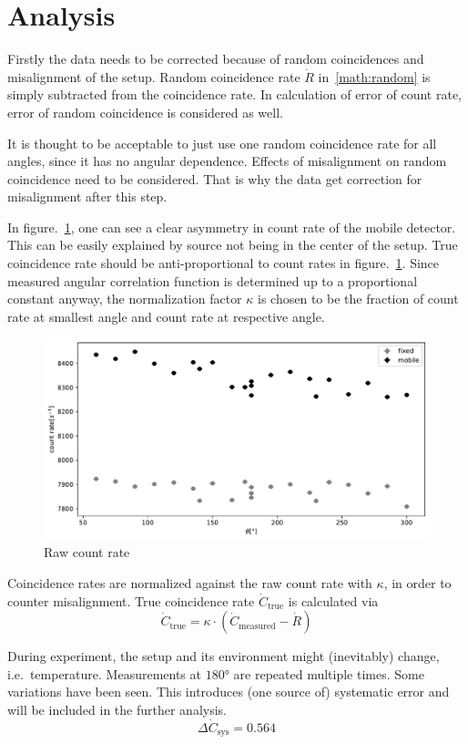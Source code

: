 \section{Analysis}\label{sec:analysis}
Firstly the data needs to be corrected because of random coincidences and misalignment of the setup. Random coincidence rate $\dot{R}$ in~\ref{math:random} is simply subtracted from the coincidence rate. In calculation of error of count rate, error of random coincidence is considered as well.

It is thought to be acceptable to just use one random coincidence rate for all angles, since it has no angular dependence. Effects of misalignment on random coincidence need to be considered. That is why the data get correction for misalignment after this step.

In figure.~\ref{fig:countRate}, one can see a clear asymmetry in count rate of the mobile detector. This can be easily explained by source not being in the center of the setup. True coincidence rate should be anti-proportional to count rates in figure.~\ref{fig:countRate}. Since measured angular correlation function is determined up to a proportional constant anyway, the normalization factor $\kappa$ is chosen to be the fraction of count rate at smallest angle and count rate at respective angle.
\begin{figure}[ht]
   \centering
   \includegraphics[width=0.8\linewidth]{./figs/countRate.pdf}
   \caption{Raw count rate}%
   \label{fig:countRate}
\end{figure}

Coincidence rates are normalized against the raw count rate with $\kappa$, in order to counter misalignment. True coincidence rate $\dot{C}_{\text{true}}$ is calculated via
\begin{equation}
   \dot{C}_\text{true} = \kappa \cdot ( \dot{C}_\text{measured} - \dot{R})
\end{equation}

During experiment, the setup and its environment might (inevitably) change, i.e.~temperature. Measurements at $180$° are repeated multiple times. Some variations have been seen. This introduces (one source of) systematic error and will be included in the further analysis.
\begin{equation}
   \Delta \dot{C}_\text{sys} = \num{0.564}
\end{equation}

